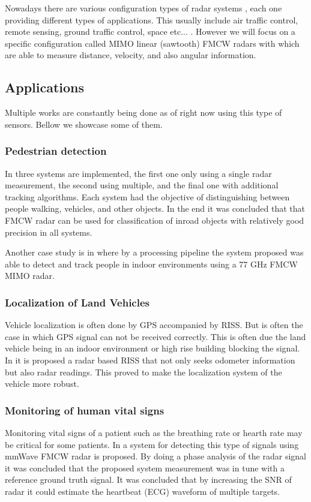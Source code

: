 Nowadays there are various configuration types of radar systems  \cite{types_radar}, each one providing different types of applications. This usually include air traffic control, remote sensing, ground traffic control, space etc... .  However we will focus on a specific configuration called \ac{MIMO} linear (sawtooth)  \ac{FMCW} radars with  which are  able to measure distance, velocity, and also angular information. 

\subsection{Applications}
Multiple works are constantly being done as of right now using this type of sensors. Bellow we showcase some of them.

  \subsubsection{Pedestrian detection}  
 In \cite{heuel2010pedestrian} three systems are implemented, the first one only using a single radar measurement, the second using multiple, and the final one with additional tracking algorithms. Each system had the objective of distinguishing between people walking, vehicles, and other objects. In the end it was concluded that that \ac{FMCW} \ac{radar} can be used for classification of inroad objects with relatively good precision in all systems.
  
   Another case study is in \cite{knudde2017indoor} where by a processing pipeline the system proposed was able to detect and track people in indoor environments using a 77 GHz FMCW MIMO radar.
   
 \subsubsection{Localization of Land Vehicles}  
  Vehicle localization is often done by \ac{GPS} accompanied by \ac{RISS}. But is often the case in which \ac{GPS} signal can not be received correctly. This is often due the land vehicle being in an indoor environment or high rise building blocking the signal. In \cite{abosekeen2018utilizing} it is proposed a radar based \ac{RISS} that not only seeks odometer information but also radar readings. This proved to make the localization system of the vehicle more robust.
  
\subsubsection{Monitoring of human vital signs}  
Monitoring vital signs of a patient such as the breathing rate or hearth rate may be critical for some patients.
In \cite{alizadeh2019remote} a system for detecting this type of signals using \ac{mmWave} \ac{FMCW} \ac{radar} is proposed. By doing a phase analysis of the \ac{radar} signal it was concluded that the proposed system measurement was in tune with a reference ground truth signal. It was concluded that by increasing the \ac{SNR} of \ac{radar} it could estimate the heartbeat (\ac{ECG}) waveform of multiple targets.

